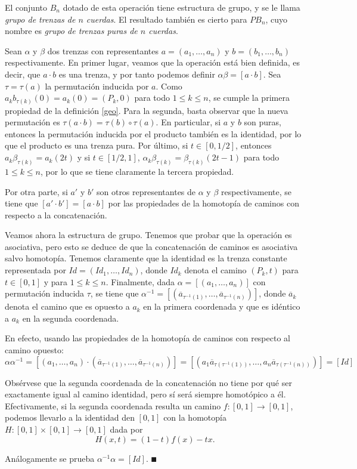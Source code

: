\documentclass[TFG.tex]{subfiles}
\begin{document}
\begin{prop}
El conjunto $B_n$ dotado de esta operación tiene estructura de grupo, y se le llama \emph{grupo de trenzas de $n$ cuerdas}. El resultado también es cierto para $PB_n$, cuyo nombre es \emph{grupo de trenzas puras de $n$ cuerdas}. 
\end{prop}

\begin{dem}
Sean $\alpha$ y $\beta$ dos trenzas con representantes $a=(a_1,\dots, a_n)$ y $b=(b_1,\dots, b_n)$ respectivamente. En primer lugar, veamos que la operación está bien definida, es decir, que $a\cdot b$ es una trenza, y por tanto podemos definir $\alpha\beta=[a\cdot b]$. Sea $\tau=\tau(a)$ la permutación inducida por $a$. Como $a_kb_{\tau(k)}(0)=a_k(0)=(P_k,0)$ para todo $1\leq k\leq n$, se cumple la primera propiedad de la definición \ref{geo}. Para la segunda, basta observar que la nueva permutación es $\tau(a\cdot b)=\tau(b)\circ \tau(a)$. En particular, si $a$ y $b$ son puras, entonces la permutación inducida por el producto también es la identidad, por lo que el producto es una trenza pura. Por último, si $t\in[0,1/2]$, entonces $a_k\beta_{\tau(k)}=a_k(2t)$ y si $t\in [1/2,1]$, $\alpha_k\beta_{\tau(k)}=\beta_{\tau(k)}(2t-1)$ para todo $1\leq k\leq n$, por lo que se tiene claramente la tercera propiedad. 

Por otra parte, si $a'$ y $b'$ son otros representantes de $\alpha$ y $\beta$ respectivamente, se tiene que $[a'\cdot b']=[a\cdot b]$ por las propiedades de la homotopía de caminos con respecto a la concatenación.

Veamos ahora la estructura de grupo. Tenemos que probar que la operación es asociativa, pero esto se deduce de que la concatenación de caminos es asociativa salvo homotopía.
Tenemos claramente que la identidad es la trenza constante representada por $Id=(Id_1,\dots, Id_n)$, donde $Id_k$ denota el camino $(P_k, t)$ para $t\in[0,1]$ y para $1\leq k\leq n$.
Finalmente, dada $\alpha=[(a_1,\dots, a_n)]$ con permutación inducida $\tau$, se tiene que $\alpha^{-1}=[(\overline{a}_{\tau^{-1}(1)},\dots, \overline{a}_{\tau^{-1}(n)})]$, donde $\overline{a}_k$ denota el camino que es opuesto a $a_k$ en la primera coordenada y que es idéntico a $a_k$ en la segunda coordenada. 

En efecto, usando las propiedades de la homotopía de caminos con respecto al camino opuesto:
\[
\alpha\alpha^{-1}=[(a_1,\dots, a_n)\cdot (\overline{a}_{\tau^{-1}(1)},\dots, \overline{a}_{\tau^{-1}(n)})]=[(a_1\overline{a}_{\tau(\tau^{-1}(1))},\dots, a_n\overline{a}_{\tau(\tau^{-1}(n))})]=[Id]
\]

Obsérvese que la segunda coordenada de la concatenación no tiene por qué ser exactamente igual al camino identidad, pero sí será siempre homotópico a él. Efectivamente, si la segunda coordenada resulta un camino $f:[0,1]\to [0,1]$, podemos llevarlo a la identidad den $[0,1]$ con la homotopía $H:[0,1]\times[0,1]\to [0,1]$ dada por
\[
H(x,t)=(1-t)f(x)-tx.
\]

Análogamente se prueba $\alpha^{-1}\alpha=[Id]$. 
$\QED$
\end{dem}
\end{document}
